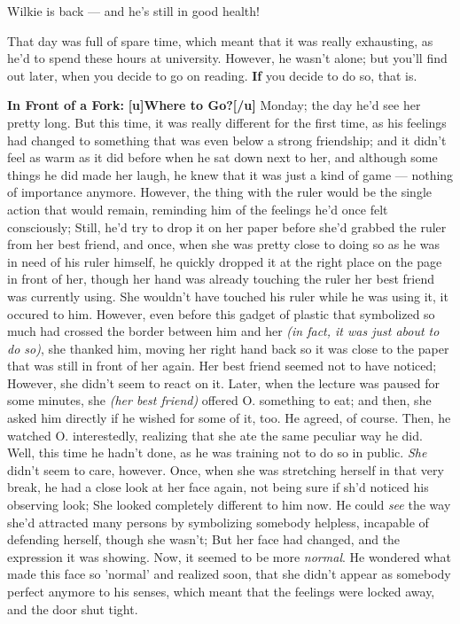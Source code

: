 Wilkie is back --- and he's still in good health!

That day was full of spare time, which meant that it was really exhausting, as he'd to spend these hours at university. 
However, he wasn't alone; but you'll find out later, when you decide to go on reading. 
\textbf{If} you decide to do so, that is. 

\textbf{In Front of a Fork: }
\textbf{[u]Where to Go?[/u]}
Monday; the day he'd see her pretty long. But this time, it was really different for the first time, as his feelings had changed to something that was even below a strong friendship; and it didn't feel as warm as it did before when he sat down next to her, and although some things he did made her laugh, he knew that it was just a kind of game --- nothing of importance anymore. However, the thing with the ruler would be the single action that would remain, reminding him of the feelings he'd once felt consciously; Still, he'd try to drop it on her paper before she'd grabbed the ruler from her best friend, and once, when she was pretty close to doing so as he was in need of his ruler himself, he quickly dropped it at the right place on the page in front of her, though her hand was already touching the ruler her best friend was currently using. 
She wouldn't have touched his ruler while he was using it, it occured to him. However, even before this gadget of plastic that symbolized so much had crossed the border between him and her \emph{(in fact, it was just about to do so)}, she thanked him, moving her right hand back so it was close to the paper that was still in front of her again. 
Her best friend seemed not to have noticed; However, she didn't seem to react on it. Later, when the lecture was paused for some minutes, she \emph{(her best friend)} offered O. something to eat; and then, she asked him directly if he wished for some of it, too. 
He agreed, of course. 
Then, he watched O. interestedly, realizing that she ate the same peculiar way he did. Well, this time he hadn't done, as he was training not to do so in public. 
\emph{She} didn't seem to care, however. Once, when she was stretching herself in that very break, he had a close look at her face again, not being sure if sh'd noticed his observing look; She looked completely different to him now. He could \emph{see} the way she'd attracted many persons by symbolizing somebody helpless, incapable of defending herself, though she wasn't; But her face had changed, and the expression it was showing. 
Now, it seemed to be more \emph{normal}. He wondered what made this face so 'normal' and realized soon, that she didn't appear as somebody perfect anymore to his senses, which meant that the feelings were locked away, and the door shut tight. 

